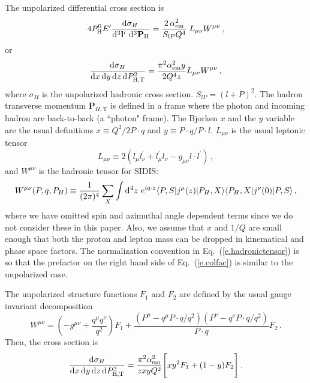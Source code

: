 \documentclass[prd,preprintnumbers,nofootinbib,superscriptaddress,onecolumn,preprint]{revtex4-1}
\newcommand{\T}[2]{\boldsymbol{#1}_{#2\text{T}}}
\newcommand{\THDsc}[1]{#1_{\text{H,T}}}
\newcommand\3[1]{\boldsymbol{#1}}
\newcommand{\eref}[1]{Eq.~(\ref{e.#1})}
\begin{document}
The unpolarized differential cross section is
%
\begin{equation}
4 P_{\rm H}^0 E^\prime 
\frac{\diff{\sigma_{H}}{}}
     {\diff{^3 {\bf l}{'}} \, \diff{^3 {\bf P}_{\rm H} }} 
= \frac{2 \, \alpha_{\rm em}^2 }{S_{lP} Q^4} \; 
L_{\mu \nu} W^{\mu \nu}\, ,
\label{e.colfac0}
\end{equation}
%
or
%
\begin{equation}
\frac{\diff{\sigma_{H}}}{\diff{x} \diff{y} \diff{z} \diff{\THDsc{P}^2}  } =
\frac{\pi^2 \alpha_{\rm em}^2 y}{2 Q^4 z }L_{\mu \nu} W^{\mu \nu} \, ,
\label{e.colfac}
\end{equation}
%
where $\sigma_{H}$ is the unpolarized hadronic cross section. $S_{lP}
= (l + P)^2$. The hadron transverse momentum $\T{P}{H,}$ is defined in
a frame where the photon and incoming hadron are back-to-back (a ``photon" frame).  
The Bjorken $x$ and the $y$ variable are the usual
definitions $x\equiv Q^2/2P\cdot q$ and $y\equiv P\cdot q/P\cdot l$.
$L_{\mu \nu}$ is the usual leptonic tensor
%
\begin{equation}
L_{\mu \nu} \equiv 2 (l_\mu l^\prime_\nu 
                + l^\prime_\mu l_\nu 
                - g_{\mu \nu} l \cdot l^\prime) \, ,
\label{e.lepttensor}
\end{equation}
%
and $W^{\mu \nu}$ is the hadronic tensor for SIDIS:
%
\begin{equation}
W^{\mu \nu}(P,q,P_H) \equiv 
  \frac{1}{(2 \pi)^4} \sum_{X} 
  \int \diff{^4 z} \, e^{i q \cdot z} 
  \langle P, S |j^{\mu}(z) | P_H,X \rangle \langle P_H,X | j^{\nu}(0) | P, S \rangle
  \, ,
\label{e.hadronictensor}
\end{equation}
%
where we have omitted spin and azimuthal angle dependent terms since
we do not consider these in this paper.  Also, we assume that $x$ and
$1/Q$ are small enough that both the proton and lepton mass can be
dropped in kinematical and phase space factors.  The normalization
convention in \eref{hadronictensor} is so that the prefactor on the
right hand side of \eref{colfac} is similar to the unpolarized case.

The unpolarized structure functions $F_1$ and $F_2$ are defined by the
usual gauge invariant decomposition
%
\begin{equation}
W^{\mu \nu} = 
  \left( -g^{\mu \nu} + \frac{q^{\mu} q^{\nu}}{q^2} \right) F_1 
  +\frac{(P^\mu - q^\mu P \cdot q / q^2)(P^\nu - q^\nu P \cdot q / q^2)}{P \cdot q} F_2
  \, .
\label{e.structdec}
\end{equation}
%
Then, the cross section is
%
\begin{equation}
\frac{\diff{\sigma_{H}}}{\diff{x} \diff{y} \diff{z} \diff{\THDsc{P}^2}}= 
  \frac{\pi^2 \alpha_{\rm em}^2}{z x y Q^2}
  \Biggl[ x y^2 F_1 + (1 - y) F_2 \Biggr]
  \, .
\end{equation}
%
\end{document}

